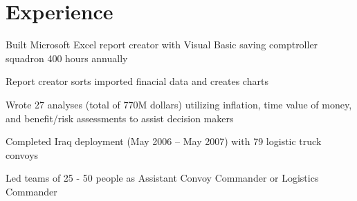 \documentclass[]{deedy-resume-openfont}
\begin{document}
\begin{minipage}[t]{0.66\textwidth}

\section{Experience}
\begin{tightemize}
\item Built Microsoft Excel report creator with Visual Basic saving comptroller squadron 400 hours annually
\item Report creator sorts imported finacial data and creates charts
\item Wrote 27 analyses (total of 770M dollars) utilizing inflation, time value of money, and benefit/risk assessments to assist decision makers
\end{tightemize}
\sectionsep

\begin{tightemize}
\item Completed Iraq deployment (May 2006 – May 2007) with 79 logistic truck convoys
\item Led teams of 25 - 50 people as Assistant Convoy Commander or Logistics Commander
\end{tightemize}
\sectionsep




\end{minipage} 
\end{document}
